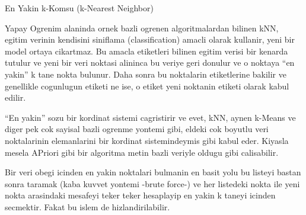 \documentclass[12pt,fleqn]{article}\usepackage{../common}
\begin{document}
En Yakin k-Komsu (k-Nearest Neighbor)

Yapay Ogrenim alaninda ornek bazli ogrenen algoritmalardan bilinen kNN,
egitim verinin kendisini siniflama (classification) amacli olarak kullanir,
yeni bir model ortaya cikartmaz. Bu amacla etiketleri bilinen egitim verisi
bir kenarda tutulur ve yeni bir veri noktasi alininca bu veriye geri
donulur ve o noktaya ``en yakin'' k tane nokta bulunur. Daha sonra bu
noktalarin etiketlerine bakilir ve genellikle cogunlugun etiketi ne ise, o
etiket yeni noktanin etiketi olarak kabul edilir.

``En yakin'' sozu bir kordinat sistemi cagristirir ve evet, kNN, aynen
k-Means ve diger pek cok sayisal bazli ogrenme yontemi gibi, eldeki cok
boyutlu veri noktalarinin elemanlarini bir kordinat sistemindeymis gibi
kabul eder. Kiyasla mesela APriori gibi bir algoritma metin bazli veriyle
oldugu gibi calisabilir. 

Bir veri obegi icinden en yakin noktalari bulmanin en basit yolu bu listeyi
bastan sonra taramak (kaba kuvvet yontemi -brute force-) ve her listedeki
nokta ile yeni nokta arasindaki mesafeyi teker teker hesaplayip en yakin k
taneyi icinden secmektir. Fakat bu islem de hizlandirilabilir. 
\end{document}
